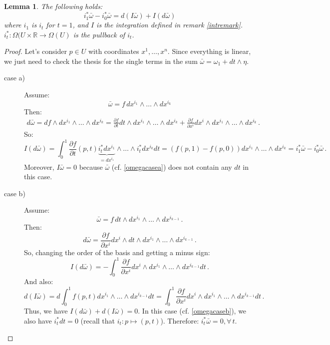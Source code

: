 \documentclass[a4paper,11pt,titlepage, article, oneside]{memoir}
\numberwithin{equation}{section}
\newtheorem{lemma}[theorem]{Lemma}
\theoremstyle{definition}
\theoremstyle{remark}
\newcommand{\rfield}{\mathbb{R}}
\newcommand{\defonde}[2]{\frac{\partial {#1}}{\partial {#2}}}
\begin{document}
\begin{lemma} \label{lemmaform2}
The following holds:
  \begin{equation}
    i_1^* \bar \omega - i_0^* \bar \omega = d(I \bar \omega) + I(d\bar \omega)
  \end{equation}
  where $i_1$ is $i_t$ for $t=1$, and $I$ is the integration defined in remark \ref{intremark}. $i^*_t\colon \Omega(U \times \rfield \rightarrow \Omega(U)$ is the pullback of $i_t$.
\end{lemma}
\begin{proof}
  Let's consider $p \in U$ with coordinates $x^1, \ldots, x^n$. Since everything is linear, we just need to check the thesis for the single terms in the sum $\bar \omega = \omega_1 + dt \wedge \eta$.
  \begin{description}
  \item[case a)] Assume:
  \begin{equation} \label{omegacasea}
  \bar \omega = f \, dx^{i_1} \wedge \ldots \wedge dx^{i_k}
  \end{equation}
  Then:
  \begin{align*}
  d \bar \omega = df \wedge dx^{i_1} \wedge \ldots \wedge dx^{i_k} = \defonde{f}{t} dt \wedge dx^{i_1} \wedge \ldots \wedge dx^{i_k} + \defonde{f}{x^i} dx^i \wedge dx^{i_1} \wedge \ldots \wedge dx^{i_k} \, .
  \end{align*}
  So:
  $$I(d\bar \omega) = \int_0^1 \defonde{f}{t}(p, t) \underbrace{i_t^* dx^{i_1}}_{=dx^{i_1}} \wedge \ldots \wedge i_t^* dx^{i_k} dt = (f(p, 1) - f(p, 0)) dx^{i_1} \wedge \ldots \wedge dx^{i_k} = i_1^* \bar \omega - i_0^* \bar \omega \, .$$
  Moreover, $I\bar \omega = 0$ because $\bar \omega$ (cf. \eqref{omegacasea}) does not contain any $dt$ in this case.
  \item[case b)] Assume:
  \begin{equation} \label{omegacaseb}
  \bar \omega  = f\, dt \wedge dx^{i_1} \wedge \ldots  \wedge dx^{i_{k-1}} \, .
  \end{equation}
  Then:
  $$d \bar \omega = \defonde{f}{x^i} dx^i \wedge dt \wedge dx^{i_1} \wedge \ldots  \wedge dx^{i_{k-1}} \, .$$
  So, changing the order of the basis and getting a minus sign:
  $$I(d \bar \omega) = - \int_0^1 \defonde{f}{x^i} dx^i \wedge dx^{i_1} \wedge \ldots \wedge dx^{i_{k-1}} dt \, .$$
  And also:
  $$d(I \bar \omega) = d \int_0^1 f(p, t) dx^{i_1} \wedge \ldots \wedge dx^{i_{k-1}} dt = \int_0^1 \defonde{f}{x^i} dx^i \wedge dx^{i_1} \wedge \ldots \wedge dx^{i_{k-1}} dt \, .$$
  Thus, we have $I(d \bar \omega) + d(I \bar \omega) = 0$. In this case (cf. \eqref{omegacaseb}), we also have $i_t^* dt = 0$ (recall that $i_t \colon p \mapsto (p, t)$). Therefore: $i_t^* \bar \omega = 0, \forall \, t$. \qedhere
  \end{description}





\end{proof}
\end{document}
